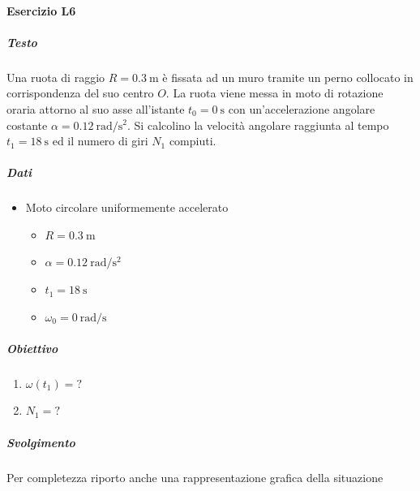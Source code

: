 \documentclass{article}
\begin{document}
\paragraph*{Esercizio L6}
\subparagraph*{Testo}
Una ruota di raggio \( R = \SI{0.3}{\meter} \) è fissata ad un muro tramite un perno collocato in corrispondenza del suo centro \( O \). La ruota viene messa in moto di rotazione oraria attorno al suo asse all'istante \( t_0 = \SI{0}{\second} \) con un'accelerazione angolare costante \( \alpha = \SI{0.12}{\radian\per\second\squared} \).
Si calcolino la velocità angolare raggiunta al tempo \( t_1 = \SI{18}{\second} \) ed il numero di giri \( N_1 \) compiuti.
\subparagraph*{Dati}
\begin{itemize}
    \item Moto circolare uniformemente accelerato
          \begin{itemize}
              \item $R = \SI{0.3}{\meter}$
              \item $\alpha = \SI{0.12}{\radian\per\second\squared}$
              \item $t_1 = \SI{18}{\second}$
              \item $\omega_0 = \SI{0}{\radian\per\second}$
          \end{itemize}
\end{itemize}
\subparagraph*{Obiettivo}
\begin{enumerate}
    \item[(a)] $\omega(t_1) = ?$
    \item[(b)] $N_1 = ?$
\end{enumerate}
\subparagraph*{Svolgimento}
Per completezza riporto anche una rappresentazione grafica della situazione
\begin{figure}[H]
    \centering
\end{figure}
\end{document}
